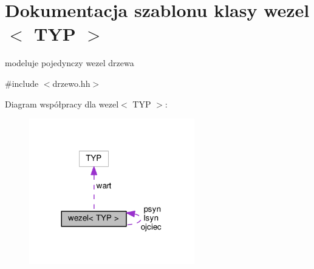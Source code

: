 \hypertarget{classwezel}{\section{Dokumentacja szablonu klasy wezel$<$ T\-Y\-P $>$}
\label{classwezel}
}


modeluje pojedynczy wezel drzewa  




{\ttfamily \#include $<$drzewo.\-hh$>$}



Diagram współpracy dla wezel$<$ T\-Y\-P $>$\-:\nopagebreak
\begin{figure}[H]
\begin{center}
\leavevmode
\includegraphics[width=204pt]{classwezel__coll__graph}
\end{center}
\end{figure}
